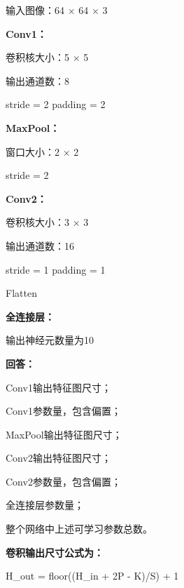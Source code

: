 \documentclass[UTF8,openany,oneside,zihao=-4,fontset=windows]{ctexbook}
\newif\ifshowsolutions
\newcommand{\PracticeSpace}[1]{\ifshowsolutions\else\par\vspace{#1}\par\fi}
\begin{document}
\par 输入图像：64 × 64 × 3
\par\noindent\textbf{Conv1：}
\par 卷积核大小：5 × 5
\par 输出通道数：8
\begin{center}\small\ttfamily stride = 2 padding = 2\end{center}
\par\noindent\textbf{MaxPool：}
\par 窗口大小：2 × 2
\par stride = 2
\par\noindent\textbf{Conv2：}
\par 卷积核大小：3 × 3
\par 输出通道数：16
\begin{center}\small\ttfamily stride = 1 padding = 1\end{center}
\par Flatten
\par\noindent\textbf{全连接层：}
\par 输出神经元数量为10
\par\noindent\textbf{回答：}
\par\noindent\textbullet\quad Conv1输出特征图尺寸；
\par\noindent\textbullet\quad Conv1参数量，包含偏置；
\par\noindent\textbullet\quad MaxPool输出特征图尺寸；
\par\noindent\textbullet\quad Conv2输出特征图尺寸；
\par\noindent\textbullet\quad Conv2参数量，包含偏置；
\par\noindent\textbullet\quad 全连接层参数量；
\par 整个网络中上述可学习参数总数。
\par\noindent\textbf{卷积输出尺寸公式为：}
\begin{center}\small\ttfamily H\_out = floor((H\_in + 2P - K)/S) + 1\end{center}
\PracticeSpace{4.2cm}
\end{document}

